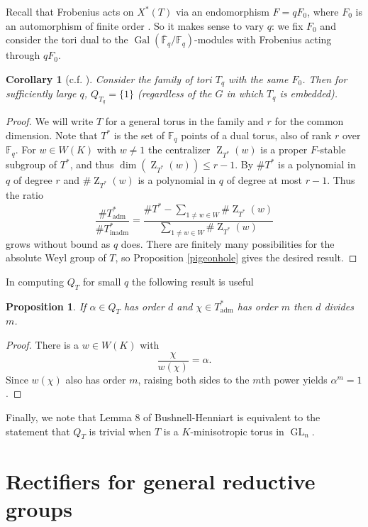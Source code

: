 \documentclass[11pt]{amsart}
\theoremstyle{plain}
\newtheorem{proposition}[theorem]{Proposition}
\newtheorem{corollary}[theorem]{Corollary}
\theoremstyle{definition}
\DeclareMathOperator{\Gal}{Gal}
\DeclareMathOperator{\Z}{Z}
\DeclareMathOperator{\GL}{GL}
\newcommand{\Fq}{\mathbb{F}_q}
\newcommand{\Fqb}{\bar{\mathbb{F}}_q}
\newcommand{\Thadm}{T^*_{\operatorname{adm}}}
\newcommand{\Thinadm}{T^*_{\operatorname{inadm}}}
\newcommand{\hatT}{T^*}
\begin{document}
Recall that Frobenius acts on $X^*(T)$ via an endomorphism $F = qF_0$, where
$F_0$ is an automorphism of finite order \cite[p. 82]{carter:93a}.  So it makes sense
to vary $q$: we fix $F_0$ and consider the tori dual to the $\Gal(\Fqb/\Fq)$-modules
with Frobenius acting through $qF_0$.

\begin{corollary}[{c.f. \cite[Lemma 8.4.2]{carter:93a}}]
Consider the family of tori $T_q$ with the same $F_0$.  Then for sufficiently large $q$,
$Q_{T_q} = \{ 1 \}$ (regardless of the $G$ in which $T_q$ is embedded).
\end{corollary}
\begin{proof}
We will write $T$ for a general torus in the family and $r$ for the common dimension.
Note that $\hatT$ is the set of $\Fq$ points of a dual torus, also of rank $r$ over $\Fq$.
For $w \in W(K)$ with $w \ne 1$ the centralizer $\Z_{\hatT}(w)$ is a proper $F$-stable
subgroup of $\hatT$, and thus $\dim(\Z_{\hatT}(w)) \le r - 1$.  By \cite[3.3.5]{carter:93a}
$\# \hatT$ is a polynomial in $q$ of degree $r$ and $\# \Z_{\hatT}(w)$ is a polynomial
in $q$ of degree at most $r-1$.  Thus the ratio
$$\frac{\# \Thadm}{\# \Thinadm} = \frac{\# \hatT - \sum_{1 \ne w \in W} \# \Z_{\hatT}(w)}{\sum_{1 \ne w \in W} \# \Z_{\hatT}(w)}$$
grows without bound as $q$ does.  There are finitely many possibilities for the absolute
Weyl group of $T$, so Proposition \ref{pigeonhole} gives the desired result.
\end{proof}

In computing $Q_T$ for small $q$ the following result is useful

\begin{proposition} \label{orderdiv}
If $\alpha \in Q_T$ has order $d$ and $\chi \in \Thadm$ has order $m$ then $d$ divides $m$.
\end{proposition}
\begin{proof}
There is a $w \in W(K)$ with
$$\frac{\chi}{w(\chi)} = \alpha.$$
Since $w(\chi)$ also has order $m$, raising both sides to the $m$th power  yields $\alpha^m = 1$.
\end{proof}

Finally, we note that Lemma 8 of Bushnell-Henniart \cite[p. 511]{bushnell-henniart:10a} is equivalent to
the statement that $Q_T$ is trivial when $T$ is a $K$-minisotropic torus in $\GL_n$.

\section{Rectifiers for general reductive groups} \label{section:general_rectifiers}
\end{document}
